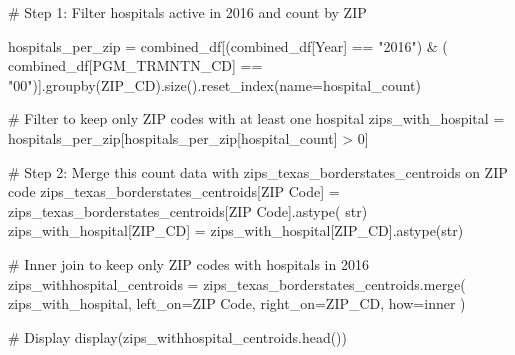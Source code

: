 \documentclass[
  letterpaper,
  DIV=11,
  numbers=noendperiod]{scrartcl}
\newenvironment{Shaded}{\begin{snugshade}}{\end{snugshade}}
\newcommand{\BuiltInTok}[1]{\textcolor[rgb]{0.00,0.23,0.31}{#1}}
\newcommand{\CommentTok}[1]{\textcolor[rgb]{0.37,0.37,0.37}{#1}}
\newcommand{\DecValTok}[1]{\textcolor[rgb]{0.68,0.00,0.00}{#1}}
\newcommand{\NormalTok}[1]{\textcolor[rgb]{0.00,0.23,0.31}{#1}}
\newcommand{\OperatorTok}[1]{\textcolor[rgb]{0.37,0.37,0.37}{#1}}
\newcommand{\StringTok}[1]{\textcolor[rgb]{0.13,0.47,0.30}{#1}}
\begin{document}
\begin{Shaded}
\begin{Highlighting}[]
\CommentTok{\# Step 1: Filter hospitals active in 2016 and count by ZIP }

\NormalTok{hospitals\_per\_zip }\OperatorTok{=}\NormalTok{ combined\_df[(combined\_df[}\StringTok{\textquotesingle{}Year\textquotesingle{}}\NormalTok{] }\OperatorTok{==} \StringTok{"2016"}\NormalTok{) }\OperatorTok{\&}\NormalTok{ (}
\NormalTok{    combined\_df[}\StringTok{\textquotesingle{}PGM\_TRMNTN\_CD\textquotesingle{}}\NormalTok{] }\OperatorTok{==} \StringTok{"00"}\NormalTok{)].groupby(}\StringTok{\textquotesingle{}ZIP\_CD\textquotesingle{}}\NormalTok{).size().reset\_index(name}\OperatorTok{=}\StringTok{\textquotesingle{}hospital\_count\textquotesingle{}}\NormalTok{)}

\CommentTok{\# Filter to keep only ZIP codes with at least one hospital}
\NormalTok{zips\_with\_hospital }\OperatorTok{=}\NormalTok{ hospitals\_per\_zip[hospitals\_per\_zip[}\StringTok{\textquotesingle{}hospital\_count\textquotesingle{}}\NormalTok{] }\OperatorTok{\textgreater{}} \DecValTok{0}\NormalTok{]}

\CommentTok{\# Step 2: Merge this count data with zips\_texas\_borderstates\_centroids on ZIP code}
\NormalTok{zips\_texas\_borderstates\_centroids[}\StringTok{\textquotesingle{}ZIP Code\textquotesingle{}}\NormalTok{] }\OperatorTok{=}\NormalTok{ zips\_texas\_borderstates\_centroids[}\StringTok{\textquotesingle{}ZIP Code\textquotesingle{}}\NormalTok{].astype(}
    \BuiltInTok{str}\NormalTok{)}
\NormalTok{zips\_with\_hospital[}\StringTok{\textquotesingle{}ZIP\_CD\textquotesingle{}}\NormalTok{] }\OperatorTok{=}\NormalTok{ zips\_with\_hospital[}\StringTok{\textquotesingle{}ZIP\_CD\textquotesingle{}}\NormalTok{].astype(}\BuiltInTok{str}\NormalTok{)}

\CommentTok{\# Inner join to keep only ZIP codes with hospitals in 2016}
\NormalTok{zips\_withhospital\_centroids }\OperatorTok{=}\NormalTok{ zips\_texas\_borderstates\_centroids.merge(}
\NormalTok{    zips\_with\_hospital, left\_on}\OperatorTok{=}\StringTok{\textquotesingle{}ZIP Code\textquotesingle{}}\NormalTok{, right\_on}\OperatorTok{=}\StringTok{\textquotesingle{}ZIP\_CD\textquotesingle{}}\NormalTok{, how}\OperatorTok{=}\StringTok{\textquotesingle{}inner\textquotesingle{}}
\NormalTok{)}

\CommentTok{\# Display}
\NormalTok{display(zips\_withhospital\_centroids.head())}
\end{Highlighting}
\end{Shaded}
\end{document}
